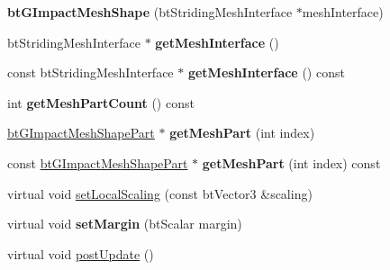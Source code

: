 \begin{DoxyCompactItemize}
\item 
\hypertarget{classbt_g_impact_mesh_shape_aa620d8c83b9f235068509f7caff0862f}{{\bfseries bt\+G\+Impact\+Mesh\+Shape} (bt\+Striding\+Mesh\+Interface $\ast$mesh\+Interface)}\label{classbt_g_impact_mesh_shape_aa620d8c83b9f235068509f7caff0862f}

\item 
\hypertarget{classbt_g_impact_mesh_shape_ac4f392b95775eaf255efcd9b6a1383c2}{bt\+Striding\+Mesh\+Interface $\ast$ {\bfseries get\+Mesh\+Interface} ()}\label{classbt_g_impact_mesh_shape_ac4f392b95775eaf255efcd9b6a1383c2}

\item 
\hypertarget{classbt_g_impact_mesh_shape_a9674acaf4d841c90fa9a6698bb4b43f1}{const bt\+Striding\+Mesh\+Interface $\ast$ {\bfseries get\+Mesh\+Interface} () const }\label{classbt_g_impact_mesh_shape_a9674acaf4d841c90fa9a6698bb4b43f1}

\item 
\hypertarget{classbt_g_impact_mesh_shape_a6cea13ee2675f58721e9cde9e7acc917}{int {\bfseries get\+Mesh\+Part\+Count} () const }\label{classbt_g_impact_mesh_shape_a6cea13ee2675f58721e9cde9e7acc917}

\item 
\hypertarget{classbt_g_impact_mesh_shape_abac8a0def4182767d8556d7ed8b08a7c}{\hyperlink{classbt_g_impact_mesh_shape_part}{bt\+G\+Impact\+Mesh\+Shape\+Part} $\ast$ {\bfseries get\+Mesh\+Part} (int index)}\label{classbt_g_impact_mesh_shape_abac8a0def4182767d8556d7ed8b08a7c}

\item 
\hypertarget{classbt_g_impact_mesh_shape_a4496e08f8ba788ea1284329edc69b54c}{const \hyperlink{classbt_g_impact_mesh_shape_part}{bt\+G\+Impact\+Mesh\+Shape\+Part} $\ast$ {\bfseries get\+Mesh\+Part} (int index) const }\label{classbt_g_impact_mesh_shape_a4496e08f8ba788ea1284329edc69b54c}

\item 
virtual void \hyperlink{classbt_g_impact_mesh_shape_aed8d5e4b2e75538109909d44b244bc35}{set\+Local\+Scaling} (const bt\+Vector3 \&scaling)
\item 
\hypertarget{classbt_g_impact_mesh_shape_aab65bdcfd34867e88a505a6377e4f79b}{virtual void {\bfseries set\+Margin} (bt\+Scalar margin)}\label{classbt_g_impact_mesh_shape_aab65bdcfd34867e88a505a6377e4f79b}

\item 
\hypertarget{classbt_g_impact_mesh_shape_afbf7ae3408bc0ab975c46ed65820a4b2}{virtual void \hyperlink{classbt_g_impact_mesh_shape_afbf7ae3408bc0ab975c46ed65820a4b2}{post\+Update} ()}\label{classbt_g_impact_mesh_shape_afbf7ae3408bc0ab975c46ed65820a4b2}


\end{DoxyCompactItemize}
